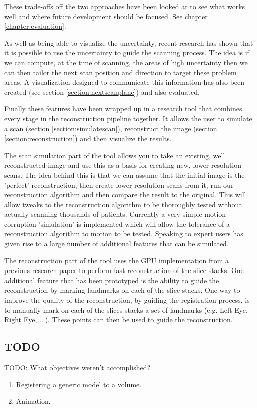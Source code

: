 These trade-offs off the two approaches have been looked at to see what works well and where future development should be focused. See chapter \ref{chapter:evaluation}.

As well as being able to visualize the uncertainty, recent research\cite{uncertaintysvd} has shown that it is possible to use the uncertainty to guide the scanning process. The idea is if we can compute, at the time of scanning, the areas of high uncertainty then we can then tailor the next scan position and direction to target these problem areas. A visualization designed to communicate this information has also been created (see section \ref{section:nextscanplane}) and also evaluated.

Finally these features have been wrapped up in a research tool that combines every stage in the reconstruction pipeline together. It allows the user to simulate a scan (section \ref{section:simulatescan}), reconstruct the image (section \ref{section:reconstruction}) and then visualize the results.

The scan simulation part of the tool allows you to take an existing, well reconstructed image and use this as a basis for creating new, lower resolution scans. The idea behind this is that we can assume that the initial image is the 'perfect' reconstruction, then create lower resolution scans from it, run our reconstruction algorithm and then compare the result to the original. This will allow tweaks to the reconstruction algorithm to be thoroughly tested without actually scanning thousands of patients. Currently a very simple motion corruption 'simulation' is implemented which will allow the tolerance of a reconstruction algorithm to motion to be tested. Speaking to expert users has given rise to a large number of additional features that can be simulated.

The reconstruction part of the tool uses the GPU implementation from a previous research paper\cite{gpureconstruction} to perform fast reconstruction of the slice stacks. One additional feature that has been prototyped is the ability to guide the reconstruction by marking landmarks on each of the slice stacks. One way to improve the quality of the reconstruction, by guiding the registration process, is to manually mark on each of the slices stacks a set of landmarks (e.g. Left Eye, Right Eye, ...). These points can then be used to guide the reconstruction.

\subsection{TODO}
TODO: What objectives weren't accomplished?
\begin{enumerate}
	\item Registering a generic model to a volume.
	\item Animation.	
\end{enumerate}